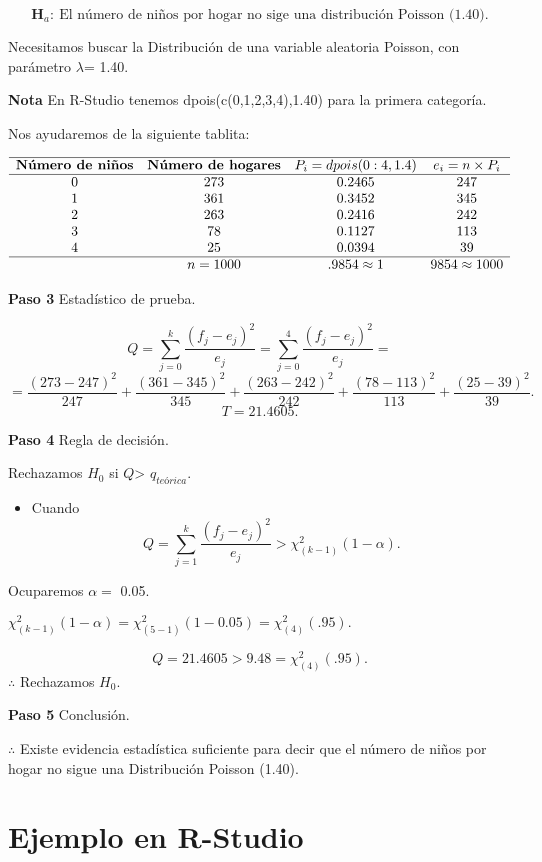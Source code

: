 \documentclass[
  a4paper,
  oneside,
  openany]{book}
\providecommand{\tightlist}{%
  \setlength{\itemsep}{0pt}\setlength{\parskip}{0pt}}
\begin{document}
\[\textbf{H}_a: \ \mbox{El número de niños por hogar no sige una distribución Poisson (1.40).}\]

Necesitamos buscar la Distribución de una variable aleatoria Poisson, con parámetro \(\lambda\)= 1.40.

\textbf{Nota} En R-Studio tenemos dpois(c(0,1,2,3,4),1.40) para la primera categoría.

Nos ayudaremos de la siguiente tablita:

\[
\begin{array}{c c c c c}
\hline
\textbf{Número de niños} & \textbf{Número de hogares} & P_{i}=dpois(0:4,1.4) & e_i=n \times P_i \\
\hline
0&273&0.2465&247 \\
1&361&0.3452&345 \\
2&263&0.2416&242 \\
3&78&0.1127&113 \\
4&25&0.0394&39 \\
\hline
&n=1000&.9854\approx1 &9854\approx1000 \\
\end{array}
\]

\textbf{Paso 3} Estadístico de prueba.

\[Q=\sum_{j=0}^{k}\frac{(f_{j}-e_{j})^2}{e_{j}}=\sum_{j=0}^{4}\frac{(f_{j}-e_{j})^2}{e_{j}}=\]
\[=\frac{(273-247)^2}{247}+\frac{(361-345)^2}{345}+\frac{(263-242)^2}{242}+\frac{(78-113)^2}{113}+\frac{(25-39)^2}{39}.\]
\[T=21.4605.\]

\textbf{Paso 4} Regla de decisión.

Rechazamos \(H_0\) si \(Q\)\textgreater{} \(q_{teórica}.\)

\begin{itemize}
\tightlist
\item
  Cuando \[Q= \sum_{j=1}^{k}\frac{(f_{j}-e_{j})^2}{e_{j}} > \chi^2_{(k-1)}(1-\alpha).\]
\end{itemize}

Ocuparemos \(\alpha=\) 0.05.

\(\chi^2_{(k-1)}(1-\alpha)=\chi^2_{(5-1)}(1-0.05) =\chi^2_{(4)}(.95).\)

\[ Q=21.4605 > 9.48= \chi^2_{(4)}(.95).\]
\(\therefore\) Rechazamos \(H_0\).

\textbf{Paso 5} Conclusión.

\(\therefore\) Existe evidencia estadística suficiente para decir que el número de niños por hogar no sigue una Distribución Poisson (1.40).

\hypertarget{ejemplo-en-r-studio-13}{%
\section{Ejemplo en R-Studio}\label{ejemplo-en-r-studio-13}}
\end{document}
